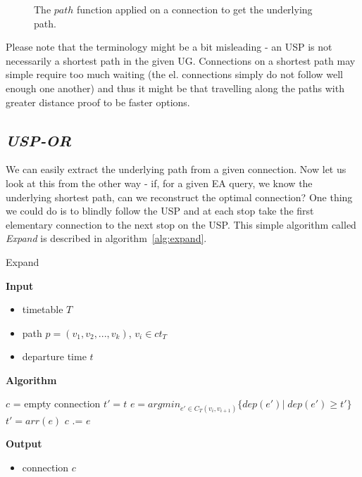 \begin{figure}[h!]
	\begin{center}
	\end{center}
	\caption{\label{fig:pathfunc} The $path$ function applied on a connection to get the underlying path.}
\end{figure}

\noindent Please note that the terminology might be a bit misleading - an USP is not necessarily a shortest path in the given UG. Connections on a shortest path may simple require too much waiting (the el. connections simply do not follow well enough one another) and thus it might be that travelling along the paths with greater distance proof to be faster options.
	    
\subsection{\textit{USP-OR}}

	We can easily extract the underlying path from a given connection. Now let us look at this from the other way - if, for a given EA query, we know the underlying shortest path, can we reconstruct the optimal connection? One thing we could do is to blindly follow the USP and at each stop take the first elementary connection to the next stop on the USP. This simple algorithm called \textit{Expand} is described in algorithm~\ref{alg:expand}. 
	
	\color{algcolor}
	\begin{algorithm}[H]
		\color{inalgcolor}
		\caption{Expand}
		\label{alg:expand}
		\textbf{Input} 
		\begin{itemize}
			\item timetable $T$
			\item path $p = (v_{1}, v_{2}, ..., v_{k})$, $v_{i} \in ct_{T}$
			\item departure time $t$
		\end{itemize}
		\textbf{Algorithm}
		\begin{algorithmic}
			\STATE $c$ = empty connection
			\STATE $t' = t$
				\STATE $e = argmin_{e' \in C_{T}(v_{i}, v_{i + 1})} \{dep(e')|\; dep(e') \geq t'\}$ 
				\STATE $t' = arr(e)$
				\STATE $c$ .= $e$ 
			\ENDFOR
		\end{algorithmic}
		\textbf{Output}
		\begin{itemize}
			\item connection $c$
		\end{itemize}
	\end{algorithm}
	\color{black}	
	
